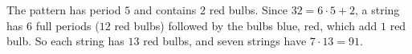 The pattern has period $5$ and contains $2$ red bulbs. Since $32=6\cdot5+2$, a string has $6$ full periods ($12$ red bulbs) followed by the bulbs blue, red, which add $1$ red bulb. So each string has $13$ red bulbs, and seven strings have $7\cdot13=\boxed{91}$.
